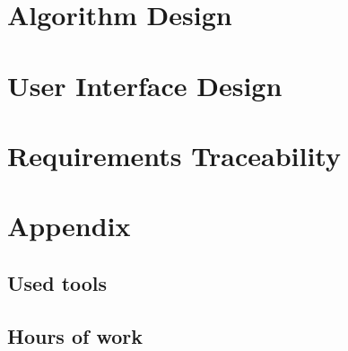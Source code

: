 \documentclass[18pt,oneside,a4paper, titlepage]{article}
\begin{document}
	\section{Algorithm Design}
		
	\section{User Interface Design}
		
	\section{Requirements Traceability}

	\section{Appendix}
		\subsection{Used tools}
		\subsection{Hours of work}
		
		
		
		
\end{document}
